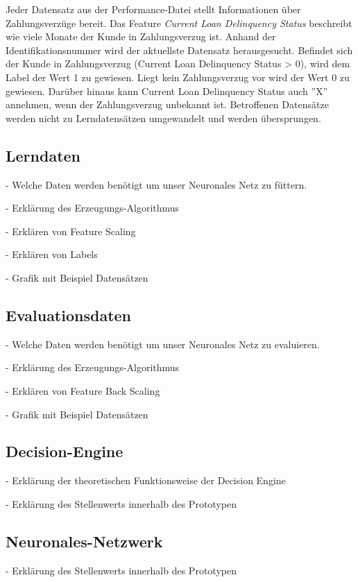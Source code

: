 Jeder Datensatz aus der Performance-Datei stellt Informationen über Zahlungsverzüge bereit. Das Feature \textit{Current Loan Delinquency Status} beschreibt wie viele Monate der Kunde in Zahlungsverzug ist. Anhand der Identifikationsnummer wird der aktuellste Datensatz herausgesucht. Befindet sich der Kunde in Zahlungsverzug (Current Loan Delinquency Status > 0), wird dem Label der Wert 1 zu gewiesen. Liegt kein Zahlungsverzug vor wird der Wert 0 zu gewiesen. Darüber hinaus kann Current Loan Delinquency Status auch ''X'' annehmen, wenn der Zahlungsverzug unbekannt ist. Betroffenen Datensätze werden nicht zu Lerndatensätzen umgewandelt und werden übersprungen.  

\subsection{Lerndaten}
\label{subsec:Lerndaten3}

- Welche Daten werden benötigt um unser Neuronales Netz zu füttern.

- Erklärung des Erzeugungs-Algorithmus 

- Erklären von Feature Scaling

- Erklären von Labels

- Grafik mit Beispiel Datensätzen

\subsection{Evaluationsdaten}
\label{subsec:Evaluationsdaten3}

- Welche Daten werden benötigt um unser Neuronales Netz zu evaluieren.

- Erklärung des Erzeugungs-Algorithmus 

- Erklären von Feature Back Scaling

- Grafik mit Beispiel Datensätzen

\subsection{Decision-Engine}
\label{subsec:Engine3}

- Erklärung der theoretischen Funktionsweise der Decision Engine

- Erklärung des Stellenwerts innerhalb des Prototypen

\subsection{Neuronales-Netzwerk}
\label{subsec:Neuro3}
- Erklärung des Stellenwerts innerhalb des Prototypen 

